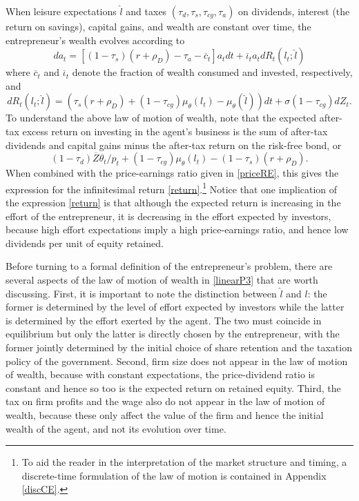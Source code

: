 \documentclass[11pt]{article}
\theoremstyle{plain}
\begin{document}
When leisure expectations $\hat{l}$ and taxes $(\tau_d,\tau_s,\tau_{cg},\tau_a)$ on dividends, interest (the return on savings), capital gains, and wealth are constant over time, the entrepreneur's wealth evolves according to
\begin{equation}
da_t = [(1-\tau_s)(r + \rho_D) - \tau_a - \overline{c}_t]a_tdt + \overline{\iota}_t a_tdR_t(l_t;\hat{l})
\label{linearP3}
\end{equation}
where $\overline{c}_t$ and $\overline{\iota}_t$ denote the fraction of wealth consumed and invested, respectively, and 
\begin{equation}
dR_t(l_t;\hat{l}) = (\tau_s (r + \rho_D) + (1- \tau_{cg})\mu_{\theta}(l_t) - \mu_{\theta}(\hat{l}))dt + \sigma(1-\tau_{cg}) dZ_t.
\label{return}
\end{equation}
To understand the above law of motion of wealth, note that the expected after-tax excess return on investing in the agent's business is the sum of after-tax dividends and capital gains minus the after-tax return on the risk-free bond, or 
$$
(1 - \tau_d)\overline{Z}\theta_t/p_t + (1 - \tau_{cg})\mu_{\theta}(l_t) - (1 - \tau_s)(r + \rho_D).
$$
When combined with the price-earnings ratio given in \eqref{priceRE}, this gives the expression for the infinitesimal return \eqref{return}.\footnote{To aid the reader in the interpretation of the market structure and timing, a discrete-time formulation of the law of motion is contained in Appendix \ref{discCE}.} Notice that one implication of the expression \eqref{return} is that although the expected return is increasing in the effort of the entrepreneur, it is decreasing in the effort expected by investors, because high effort expectations imply a high price-earnings ratio, and hence low dividends per unit of equity retained. 


Before turning to a formal definition of the entrepreneur's problem, there are several aspects of the law of motion of wealth in \eqref{linearP3} that are worth discussing. First, it is important to note the distinction between $\hat{l}$ and $l$: the former is determined by the level of effort expected by investors while the latter is determined by the effort exerted by the agent. The two must coincide in equilibrium but only the latter is directly chosen by the entrepreneur, with the former jointly determined by the initial choice of share retention and the taxation policy of the government. Second, firm size does not appear in the law of motion of wealth, because with constant expectations, the price-dividend ratio is constant and hence so too is the expected return on retained equity. Third, the tax on firm profits and the wage also do not appear in the law of motion of wealth, because these only affect the value of the firm and hence the initial wealth of the agent, and not its evolution over time. 
\end{document}
